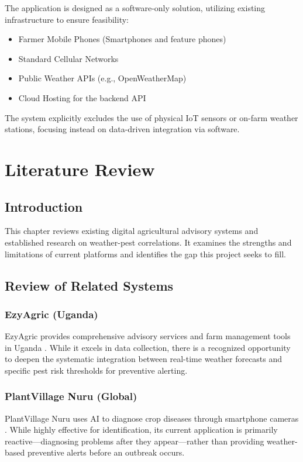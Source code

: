\documentclass[12pt]{report}
\begin{document}
The application is designed as a software-only solution, utilizing existing infrastructure to ensure feasibility:
\begin{itemize}
    \item Farmer Mobile Phones (Smartphones and feature phones)
    \item Standard Cellular Networks
    \item Public Weather APIs (e.g., OpenWeatherMap)
    \item Cloud Hosting for the backend API
\end{itemize}
The system explicitly excludes the use of physical IoT sensors or on-farm weather stations, focusing instead on data-driven integration via software.

\chapter{Literature Review}
\label{chapter:literature-review}

\section{Introduction}
This chapter reviews existing digital agricultural advisory systems and established research on weather-pest correlations. It examines the strengths and limitations of current platforms and identifies the gap this project seeks to fill.

\section{Review of Related Systems}

\subsection{EzyAgric (Uganda)}
EzyAgric provides comprehensive advisory services and farm management tools in Uganda \cite{MAAIF2020}. While it excels in data collection, there is a recognized opportunity to deepen the systematic integration between real-time weather forecasts and specific pest risk thresholds for preventive alerting.

\subsection{PlantVillage Nuru (Global)}
PlantVillage Nuru uses AI to diagnose crop diseases through smartphone cameras \cite{FAO2022}. While highly effective for identification, its current application is primarily reactive—diagnosing problems after they appear—rather than providing weather-based preventive alerts before an outbreak occurs.
\end{document}
